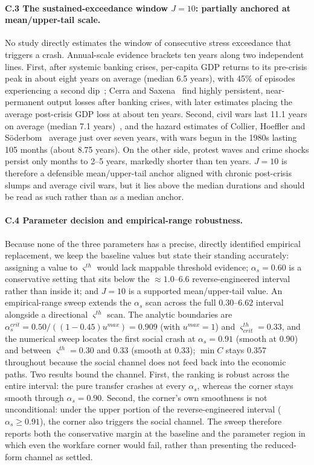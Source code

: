 \documentclass[12pt]{article}
\theoremstyle{plain}
\begin{document}
\paragraph{C.3 The sustained-exceedance window $J=10$: partially anchored at mean/upper-tail scale.}
No study directly estimates the window of consecutive stress exceedance that
triggers a crash. Annual-scale evidence brackets ten years along two
independent lines. First, after systemic banking crises, per-capita GDP returns
to its pre-crisis peak in about eight years on average (median 6.5 years), with
45\% of episodes experiencing a second dip~\cite{RR2014}; Cerra and
Saxena~\cite{CS2008} find highly persistent, near-permanent output losses
after banking crises, with later estimates placing the average post-crisis GDP
loss at about ten years. Second, civil wars last 11.1 years on average (median
7.1 years)~\cite{Fearon2004}, and the hazard estimates of Collier, Hoeffler
and S\"oderbom~\cite{CHS2004} average just over seven years, with wars begun
in the 1980s lasting 105 months (about 8.75 years). On the other side, protest
waves and crime shocks persist only months to 2--5 years, markedly shorter
than ten years. $J=10$ is therefore a defensible mean/upper-tail anchor
aligned with chronic post-crisis slumps and average civil wars, but it lies
above the median durations and should be read as such rather than as a median
anchor.

\paragraph{C.4 Parameter decision and empirical-range robustness.}
Because none of the three parameters has a precise, directly identified
empirical replacement, we keep the baseline values but state their standing
accurately: assigning a value to $\varsigma^{th}$ would lack mappable threshold
evidence; $\alpha_s=0.60$ is a conservative setting that sits below the
$\approx1.0$--$6.6$ reverse-engineered interval rather than inside it; and
$J=10$ is a supported mean/upper-tail value. An empirical-range sweep extends
the $\alpha_s$ scan across the full $0.30$--$6.62$ interval alongside a
directional $\varsigma^{th}$ scan. The analytic boundaries are
$\alpha_s^{crit}=0.50/((1-0.45)u^{max})=0.909$ (with $u^{max}=1$) and
$\varsigma^{th}_{crit}=0.33$, and the numerical sweep locates the first social
crash at $\alpha_s=0.91$ (smooth at $0.90$) and between
$\varsigma^{th}=0.30$ and $0.33$ (smooth at $0.33$); $\min C$ stays $0.357$
throughout because the social channel does not feed back into the economic
paths. Two results bound the channel. First, the ranking is robust across the
entire interval: the pure transfer crashes at every $\alpha_s$, whereas the
corner stays smooth through $\alpha_s=0.90$. Second, the corner's own
smoothness is not unconditional: under the upper portion of the
reverse-engineered interval ($\alpha_s\geq0.91$), the corner also triggers the
social channel. The sweep therefore reports both the conservative margin at
the baseline and the parameter region in which even the workfare corner would
fail, rather than presenting the reduced-form channel as settled.
\end{document}
